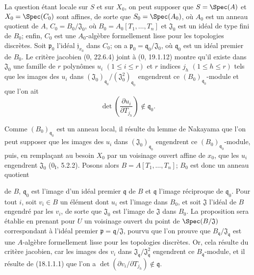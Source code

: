 La question étant locale sur $S$ et sur $X_0$, on peut supposer que $S=\Spec(A)$ et $X_0=\Spec(C_0)$ sont affines, de sorte que $S_0=\Spec(A_0)$, où $A_0$ est un anneau quotient de $A$, $C_0=B_0/\mathfrak J_0$, où $B_0=A_0[T_1,\ldots,T_n]$ et $\mathfrak J_0$ est un idéal de type fini de $B_0$; enfin, $C_0$ est une $A_0$-algèbre formellement lisse pour les topologies discrètes. Soit $\mathfrak p_0$ l'idéal $\mathfrak j_{x_0}$ dans $C_0$; on a $\mathfrak p_0=\mathfrak q_0/\mathfrak J_0$, où $\mathfrak q_0$ est un idéal premier de $B_0$. Le critère jacobien (0, 22.6.4) joint à (0, 19.1.12) montre qu'il existe dans $\mathfrak J_0$ une famille de $r$ polynômes $u_i$ $(1\leq i\leq r)$ et $r$ indices $j_h$ $(1\leq h\leq r)$ tels que les images des $u_i$ dans $(\mathfrak J_0)_{\mathfrak q_0}/(\mathfrak J_0^2)_{\mathfrak q_0}$ engendrent ce $(B_0)_{\mathfrak q_0}$-module et que l'on ait
\begin{equation}
  \det\left(\frac{\partial u_i}{\partial T_{j_h}}\right)\notin\mathfrak q_0.
  \tag{18.1.1.1}\label{IV.18.1.1.1}
\end{equation}

Comme $(B_0)_{\mathfrak q_0}$ est un anneau local, il résulte du lemme de Nakayama que l'on peut supposer que les images des $u_i$ dans $(\mathfrak J_0)_{\mathfrak q_0}$ engendrent ce $(B_0)_{\mathfrak q_0}$-module, puis, en remplaçant au besoin $X_0$ par un voisinage ouvert affine de $x_0$, que les $u_i$ engendrent $\mathfrak J_0$ ($0_{\mathrm I}$, 5.2.2). Posons alors $B=A[T_1,\ldots,T_n]$; $B_0$ est donc un anneau quotient


de $B$, $\mathfrak q_0$ est l'image d'un idéal premier $\mathfrak q$ de $B$ et $\mathfrak q$ l'image réciproque de $\mathfrak q_0$. Pour tout $i$, soit $v_i\in B$ un élément dont $u_i$ est l'image dans $B_0$, et soit $\mathfrak J$ l'idéal de $B$ engendré par les $v_i$, de sorte que $\mathfrak J_0$ est l'image de $\mathfrak J$ dans $B_0$. La proposition sera établie en prenant pour $U$ un voisinage ouvert du point de $\Spec(B/\mathfrak J)$ correspondant à l'idéal premier $\mathfrak p=\mathfrak q/\mathfrak J$, pourvu que l'on prouve que $B_{\mathfrak q}/\mathfrak J_{\mathfrak q}$ est une $A$-algèbre formellement lisse pour les topologies discrètes. Or, cela résulte du critère jacobien, car les images des $v_i$ dans $\mathfrak J_{\mathfrak q}/\mathfrak J_{\mathfrak q}^2$ engendrent ce $B_{\mathfrak q}$-module, et il résulte de (18.1.1.1) que l'on a $\det(\partial v_i/\partial T_{j_h})\notin\mathfrak q$.

